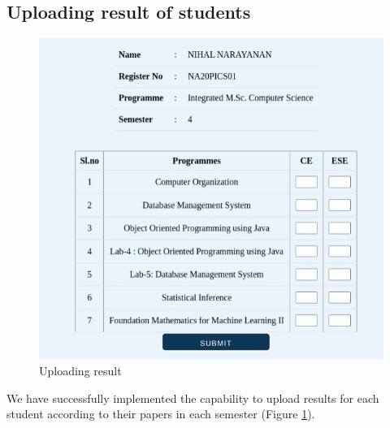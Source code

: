 \documentclass{nascproject}
\begin{document}
\subsection{Uploading result of students}
\begin{figure}
	\centering
	\includegraphics[width=1\linewidth]{upload1.jpeg}
	\caption{Uploading result}
	\label{upload}
\end{figure}
We have successfully implemented the capability to upload results for each student according to their papers in each semester (Figure \ref{upload}).
\end{document}
